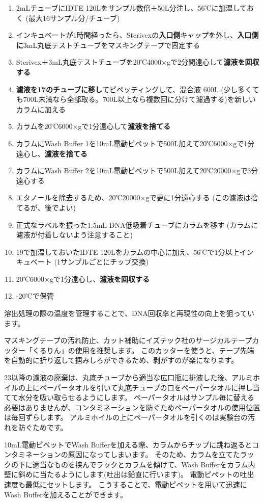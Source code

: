 \documentclass[titlepage,10pt,a4paper,uplatex]{jsbook}
\renewcommand{\textbf}[1]{{\bfseries\sffamily#1}}
\begin{document}
\begin{enumerate}
\item 2mLチューブにIDTE 120{\textmu}Lをサンプル数倍＋50{\textmu}L分注し、56℃に加温しておく (最大16サンプル分/チューブ)
\item インキュベートが1時間経ったら、Sterivexの\textbf{入口側}キャップを外し、\textbf{入口側に}3mL丸底テストチューブをマスキングテープで固定する
\item Sterivex＋3mL丸底テストチューブを20℃4000×gで2分間遠心して\textbf{濾液を回収する}
\item \textbf{濾液を17のチューブに移し}てピペッティングして、混合液 600{\textmu}L (少し多くても700{\textmu}L未満なら全部取る。700{\textmu}L以上なら複数回に分けて濾過する)を新しいカラムに加える
\item カラムを20℃6000×gで1分遠心して\textbf{濾液を捨てる}
\item カラムにWash Buffer 1を10mL電動ピペットで500{\textmu}L加えて20℃6000×gで1分遠心し、\textbf{濾液を捨てる}
\item カラムにWash Buffer 2を10mL電動ピペットで500{\textmu}L加えて20℃20000×gで3分遠心する
\item エタノールを除去するため、20℃20000×gで更に1分遠心する (この濾液は捨てるが、後でよい)
\item 正式なラベルを振った1.5mL DNA低吸着チューブにカラムを移す (カラムに濾液が付着しないよう注意すること)
\item 19で加温しておいたIDTE 120{\textmu}Lをカラムの中心に加え、56℃で1分以上インキュベート (1サンプルごとにチップ交換)
\item 20℃6000×gで1分遠心し、\textbf{濾液を回収する}
\item -20℃で保管
\end{enumerate}

溶出処理の際の温度を管理することで、DNA回収率と再現性の向上を狙っています。

マスキングテープの汚れ防止、カット補助にイズテック社のサージカルテープカッター「くるりん」の使用を推奨します。
このカッターを使うと、テープ先端を自動的に折り返して掴みしろができるため、剥がすのが楽になります。

23以降の濾液の廃棄は、丸底チューブから適当な広口瓶に排液した後、アルミホイルの上にペーパータオルを引いて丸底チューブの口をペーパータオルに押し当てて水分を吸い取らせるようにします。
ペーパータオルはサンプル毎に替える必要はありませんが、コンタミネーションを防ぐためペーパータオルの使用位置は毎回ずらします。
アルミホイルの上にペーパータオルを引くのは実験台の汚れを防ぐためです。

10mL電動ピペットでWash Bufferを加える際、カラムからチップに跳ね返るとコンタミネーションの原因になってしまいます。
そのため、カラムを立てたラックの下に適当なものを挟んでラックとカラムを傾けて、Wash Bufferをカラム内壁に斜めに当たるようにします(吐出は鉛直に行います)。
電動ピペットの吐出速度も最低にセットします。
こうすることで、電動ピペットを用いて迅速にWash Bufferを加えることができます。
\end{document}
